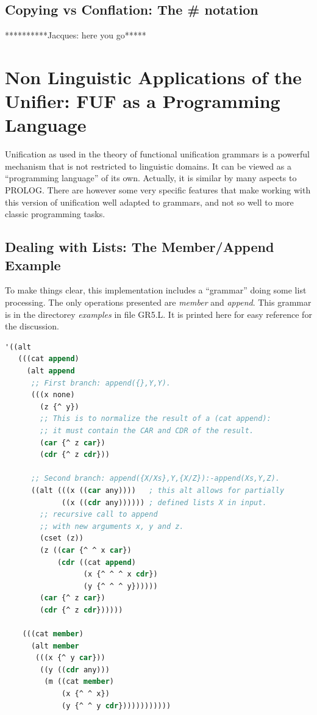 \documentclass[10pt,a4paper]{report}
\begin{document}
\begin{appendices}
\section{Copying vs Conflation: The \#{} notation}

**********Jacques: here you go*****


\chapter{Non Linguistic Applications of the Unifier: FUF as a Programming Language}
\label{prolog}

Unification as used in the theory of functional unification grammars is a
powerful mechanism that is not restricted to linguistic domains. It can be
viewed as a ``programming language'' of its own. Actually, it is similar by
many aspects to PROLOG. There are however some very specific features that
make working with this version of unification well adapted to grammars, and
not so well to more classic programming tasks.

\section{Dealing with Lists: The Member/Append Example}

To make things clear, this implementation includes a ``grammar''
doing some list processing. The only operations presented are
{\em member} and {\em append}. This grammar is in the directorey
{\em examples} in file GR5.L. It is printed here for easy reference
for the discussion.  

\begin{lstlisting}[language=Lisp]
'((alt
   (((cat append)
	 (alt append
	  ;; First branch: append({},Y,Y).
	  (((x none) 
		(z {^ y})
		;; This is to normalize the result of a (cat append):
		;; it must contain the CAR and CDR of the result.
		(car {^ z car})
		(cdr {^ z cdr}))

	  ;; Second branch: append({X/Xs},Y,{X/Z}):-append(Xs,Y,Z).
	  ((alt (((x ((car any))))   ; this alt allows for partially
		     ((x ((cdr any)))))) ; defined lists X in input.
		;; recursive call to append
		;; with new arguments x, y and z.
		(cset (z))
		(z ((car {^ ^ x car})
			(cdr ((cat append)
				  (x {^ ^ ^ x cdr})
				  (y {^ ^ ^ y})))))
		(car {^ z car})
		(cdr {^ z cdr})))))
	
	(((cat member)
	  (alt member 
	   (((x {^ y car}))
		((y ((cdr any)))
		 (m ((cat member)
			 (x {^ ^ x})
			 (y {^ ^ y cdr})))))))))))
\end{lstlisting}



\end{appendices}
\end{document}
